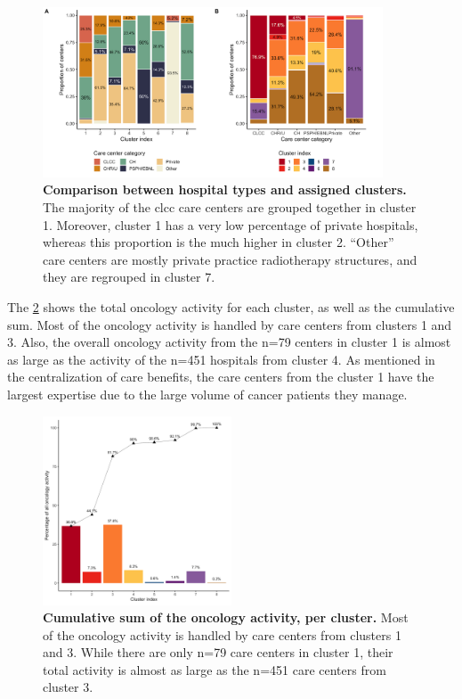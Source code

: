 \begin{figure}[H]
    \includegraphics[width=0.9\textwidth]{images/camion/supplemental/sup_fig2_categories_per_cluster.png}
    \centering
    \caption{ \textbf{Comparison between hospital types and assigned clusters.}
        The majority of the \ac{clcc} care centers are grouped together in
        cluster 1. Moreover, cluster 1 has a very low percentage of private
        hospitals, whereas this proportion is the much higher in cluster 2.
        “Other” care centers are mostly private practice radiotherapy
        structures, and they are regrouped in cluster 7. }
    \label{fig:clustering-categories}
\end{figure}

The \cref{fig:clustering-cumulative} shows the total oncology activity for each
cluster, as well as the cumulative sum. Most of the oncology activity is handled
by care centers from clusters 1 and 3. Also, the overall oncology activity from
the n=79 centers in cluster 1 is almost as large as the activity of the n=451
hospitals from cluster 4. As mentioned in the centralization of care benefits,
the care centers from the cluster 1 have the largest expertise due to the
large volume of cancer patients they manage.

\begin{figure}[H]
    \includegraphics[width=0.5\textwidth]{images/camion/supplemental/sup_fig3_nb_stays_per_cluster.png}
    \centering
    \caption{ \textbf{Cumulative sum of the oncology activity, per cluster.}
        Most of the oncology activity is handled by care centers from clusters 1
        and 3. While there are only n=79 care centers in cluster 1, their total
        activity is almost as large as the n=451 care centers from cluster 3. }
    \label{fig:clustering-cumulative}
\end{figure}

